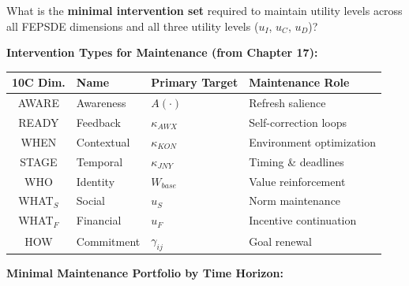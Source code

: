 What is the \textbf{minimal intervention set} required to maintain utility levels across all FEPSDE dimensions and all three utility levels ($u_I$, $u_C$, $u_D$)?

\textbf{Intervention Types for Maintenance (from Chapter 17):}

\begin{center}
\renewcommand{\arraystretch}{1.2}
\begin{tabular}{@{}clll@{}}
\toprule
\textbf{10C Dim.} & \textbf{Name} & \textbf{Primary Target} & \textbf{Maintenance Role} \\
\midrule
AWARE & Awareness & $A(\cdot)$ & Refresh salience \\
READY & Feedback & $\kappa_{AWX}$ & Self-correction loops \\
WHEN & Contextual & $\kappa_{KON}$ & Environment optimization \\
STAGE & Temporal & $\kappa_{JNY}$ & Timing \& deadlines \\
WHO & Identity & $W_{base}$ & Value reinforcement \\
WHAT$_S$ & Social & $u_S$ & Norm maintenance \\
WHAT$_F$ & Financial & $u_F$ & Incentive continuation \\
HOW & Commitment & $\gamma_{ij}$ & Goal renewal \\
\bottomrule
\end{tabular}
\end{center}

\textbf{Minimal Maintenance Portfolio by Time Horizon:}


